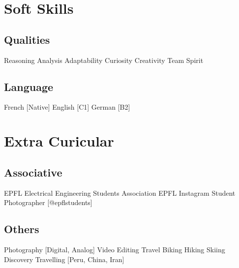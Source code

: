 \documentclass{article}
\newcommand{\descript}[1]{\color{darkgray}\normalfont \textbf{#1\\}}
\newcommand{\longdescript}[1]{\color{subheadings}\normalfont\small {#1\\} }
\newcommand{\location}[1]{\color{primary}\headingfont {\hfill #1\\} }
\newcommand{\sectionsep}[0]{\vspace{-6pt}}
\newcommand{\mybullet}[1]{ \hspace{2pt}\textbullet{#1}\hspace{2pt} }
\begin{document}


\section{Soft Skills}
\subsection{Qualities}
\longdescript{Reasoning \mybullet{} Analysis \mybullet{} Adaptability \mybullet{} Curiosity \mybullet{} Creativity \mybullet{} Team Spirit }
\sectionsep
\subsection{Language}
\longdescript{French [Native] \mybullet{} English [C1] \mybullet{} German [B2] }
\sectionsep

\section{Extra Curicular}
\subsection{Associative}
\longdescript{EPFL Electrical Engineering Students Association \mybullet{} EPFL Instagram Student Photographer [@epflstudents] }
\sectionsep
\subsection{Others}
\longdescript{Photography [Digital, Analog] \mybullet{}  Video Editing \mybullet{} Travel Biking \mybullet{} Hiking \mybullet{} Skiing \mybullet{} Discovery Travelling [Peru, China, Iran]} 
\sectionsep


\end{document}

